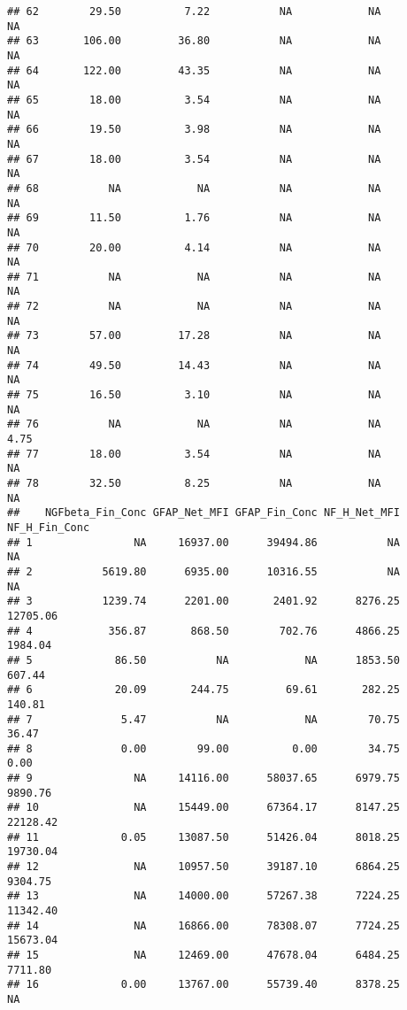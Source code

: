 \documentclass[]{article}
\begin{document}
\begin{verbatim}
## 62        29.50          7.22           NA            NA              NA
## 63       106.00         36.80           NA            NA              NA
## 64       122.00         43.35           NA            NA              NA
## 65        18.00          3.54           NA            NA              NA
## 66        19.50          3.98           NA            NA              NA
## 67        18.00          3.54           NA            NA              NA
## 68           NA            NA           NA            NA              NA
## 69        11.50          1.76           NA            NA              NA
## 70        20.00          4.14           NA            NA              NA
## 71           NA            NA           NA            NA              NA
## 72           NA            NA           NA            NA              NA
## 73        57.00         17.28           NA            NA              NA
## 74        49.50         14.43           NA            NA              NA
## 75        16.50          3.10           NA            NA              NA
## 76           NA            NA           NA            NA            4.75
## 77        18.00          3.54           NA            NA              NA
## 78        32.50          8.25           NA            NA              NA
##    NGFbeta_Fin_Conc GFAP_Net_MFI GFAP_Fin_Conc NF_H_Net_MFI NF_H_Fin_Conc
## 1                NA     16937.00      39494.86           NA            NA
## 2           5619.80      6935.00      10316.55           NA            NA
## 3           1239.74      2201.00       2401.92      8276.25      12705.06
## 4            356.87       868.50        702.76      4866.25       1984.04
## 5             86.50           NA            NA      1853.50        607.44
## 6             20.09       244.75         69.61       282.25        140.81
## 7              5.47           NA            NA        70.75         36.47
## 8              0.00        99.00          0.00        34.75          0.00
## 9                NA     14116.00      58037.65      6979.75       9890.76
## 10               NA     15449.00      67364.17      8147.25      22128.42
## 11             0.05     13087.50      51426.04      8018.25      19730.04
## 12               NA     10957.50      39187.10      6864.25       9304.75
## 13               NA     14000.00      57267.38      7224.25      11342.40
## 14               NA     16866.00      78308.07      7724.25      15673.04
## 15               NA     12469.00      47678.04      6484.25       7711.80
## 16             0.00     13767.00      55739.40      8378.25            NA

\end{verbatim}
\end{document}

